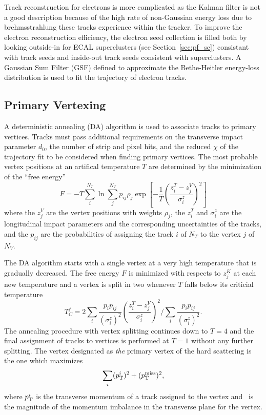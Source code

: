 Track reconstruction for electrons is more complicated as the Kalman filter is not a good description because of the high rate of non-Gaussian energy loss due to brehmsstrahlung these tracks experience within the tracker.
To improve the electron reconstruction efficiency, the electron seed collection is filled both by looking outside-in for ECAL superclusters (see Section~\ref{sec:pf_sc}) consistant with track seeds and inside-out track seeds consistent with superclusters.
A Gaussian Sum Filter (GSF) defined to approximate the Bethe-Heitler energy-loss distribution is used to fit the trajectory of electron tracks. 

\subsection{Primary Vertexing}
\label{sec:pf_pv}


A deterministic annealing (DA) algorithm is used to associate tracks to primary vertices.
Tracks must pass additional requirements on the transverse impact parameter $d_0$, the number of strip and pixel hits, and the reduced $\chi$ of the trajectory fit to be considered when finding primary vertices.
The most probable vertex positions at an artifical temperature $T$ are determined by the minimization of the ``free energy''
\begin{equation}
  F = -T \sum_i^{N_T} \ln \sum_j^{N_V} p_{ij} \rho_j \exp \left[ - \frac{1}{T} \left(\frac{z_i^T - z_j^V}{\sigma^z_i}\right)^2 \right]
\end{equation}
where the $z_j^V$ are the vertex positions with weights $\rho_j$, the $z_i^T$ and $\sigma_i^z$  are the longitudinal impact parameters and the corresponding uncertainties of the tracks, and the $p_{ij}$ are the probabilities of assigning the track $i$ of $N_T$ to the vertex $j$ of $N_V$.

The DA algorithm starts with a single vertex at a very high temperature that is gradually decreased.
The free energy $F$ is minimized with respects to $z_j^K$ at each new temperature and a vertex is split in two whenever $T$ falls below its criticial temperature
\begin{equation}
  T_C^j = 2 \sum_i \frac{p_i p_{ij}}{\left(\sigma_i^z\right)^2} \left(\frac{z_i^T - z_j^V}{\sigma^z_i}\right)^2 \Bigg/ \sum_i \frac{p_i p_{ij}}{\left(\sigma_i^z\right)^2}.
\end{equation}
The annealing procedure with vertex splitting continues down to $T = 4$ and the final assignment of tracks to vertices is performed at $T = 1$ without any further splitting. 
The vertex designated as \textit{the} primary vertex of the hard scattering is the one which maximizes
\begin{equation}
  \sum_i  (p_{\mathrm{T}}^i)^2 + (p_{\mathrm{T}}^\text{miss})^2,
  \end{equation}
where $p_{\mathrm{T}}^i$ is the transverse momentum of a track assigned to the vertex and \ptmiss\ is the magnitude of the momentum imbalance in the transverse plane for the vertex. 

